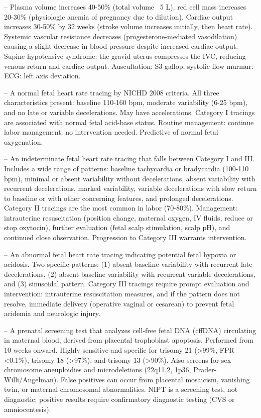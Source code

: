 -- Plasma volume increases 40-50\% (total volume ~5 L), red cell mass increases 20-30\% (physiologic anemia of pregnancy due to dilution). Cardiac output increases 30-50\% by 32 weeks (stroke volume increases initially, then heart rate). Systemic vascular resistance decreases (progesterone-mediated vasodilation) causing a slight decrease in blood pressure despite increased cardiac output. Supine hypotensive syndrome: the gravid uterus compresses the IVC, reducing venous return and cardiac output. Auscultation: S3 gallop, systolic flow murmur. ECG: left axis deviation.

-- A normal fetal heart rate tracing by NICHD 2008 criteria. All three characteristics present: baseline 110-160 bpm, moderate variability (6-25 bpm), and no late or variable decelerations. May have accelerations. Category I tracings are associated with normal fetal acid-base status. Routine management: continue labor management; no intervention needed. Predictive of normal fetal oxygenation.

-- An indeterminate fetal heart rate tracing that falls between Category I and III. Includes a wide range of patterns: baseline tachycardia or bradycardia (100-110 bpm), minimal or absent variability without decelerations, absent variability with recurrent decelerations, marked variability, variable decelerations with slow return to baseline or with other concerning features, and prolonged decelerations. Category II tracings are the most common in labor (70-80\%). Management: intrauterine resuscitation (position change, maternal oxygen, IV fluids, reduce or stop oxytocin), further evaluation (fetal scalp stimulation, scalp pH), and continued close observation. Progression to Category III warrants intervention.

-- An abnormal fetal heart rate tracing indicating potential fetal hypoxia or acidosis. Two specific patterns: (1) absent baseline variability with recurrent late decelerations, (2) absent baseline variability with recurrent variable decelerations, and (3) sinusoidal pattern. Category III tracings require prompt evaluation and intervention: intrauterine resuscitation measures, and if the pattern does not resolve, immediate delivery (operative vaginal or cesarean) to prevent fetal acidemia and neurologic injury.

-- A prenatal screening test that analyzes cell-free fetal DNA (cffDNA) circulating in maternal blood, derived from placental trophoblast apoptosis. Performed from 10 weeks onward. Highly sensitive and specific for trisomy 21 (>99\%, FPR <0.1\%), trisomy 18 (>97\%), and trisomy 13 (>90\%). Also screens for sex chromosome aneuploidies and microdeletions (22q11.2, 1p36, Prader-Willi/Angelman). False positives can occur from placental mosaicism, vanishing twin, or maternal chromosomal abnormalities. NIPT is a screening test, not diagnostic; positive results require confirmatory diagnostic testing (CVS or amniocentesis).

